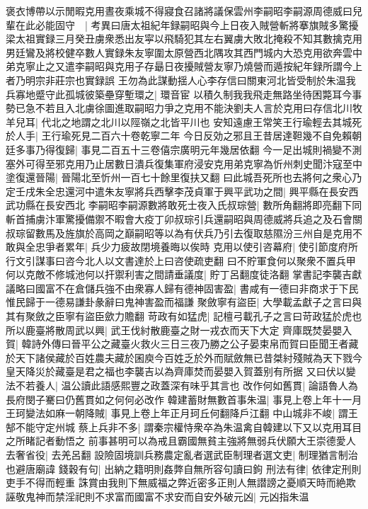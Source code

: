 褒衣博帶以示閒暇克用晝夜乘城不得寢食召諸將議保雲州李嗣昭李嗣源周德威曰兒輩在此必能固守　|{
	考異曰唐太祖紀年録嗣昭與今上日夜入賊營斬將搴旗賊多驚擾梁太祖實録三月癸丑虜衆悉出友寜以飛騎犯其左右翼虜大敗北掩殺不知其數擒克用男廷鸞及將校健卒數人實録朱友寧圍太原營西北隅攻其西門城内大恐克用欲奔雲中弟克寧止之又遣李嗣昭與克用子存朂日夜擾賊營友寧乃燒營而遁按紀年録所謂今上者乃明宗非莊宗也實録誤}
王勿為此謀動揺人心李存信曰關東河北皆受制於朱温我兵寡地蹙守此孤城彼築壘穿塹環之|{
	環音宦}
以積久制我我飛走無路坐待困斃耳今事勢已急不若且入北虜徐圖進取嗣昭力爭之克用不能決劉夫人言於克用曰存信北川牧羊兒耳|{
	代北之地謂之北川以陘嶺之北皆平川也}
安知遠慮王常笑王行瑜輕去其城死於人手|{
	王行瑜死見二百六十卷乾寧二年}
今日反効之邪且王昔居達靼幾不自免賴朝廷多事乃得復歸|{
	事見二百五十三卷僖宗廣明元年幾居依翻}
今一足出城則禍變不測塞外可得至邪克用乃止居數日潰兵復集軍府浸安克用弟克寧為忻州刺史聞汴寇至中塗復還晉陽|{
	晉陽北至忻州一百七十餘里復扶又翻}
曰此城吾死所也去將何之衆心乃定壬戌朱全忠還河中遣朱友寧將兵西擊李茂貞軍于興平武功之間|{
	興平縣在長安西武功縣在長安西北}
李嗣昭李嗣源數將敢死士夜入氏叔琮營|{
	數所角翻將即亮翻下同}
斬首捕虜汴軍驚擾備禦不暇會大疫丁卯叔琮引兵還嗣昭與周德威將兵追之及石會關叔琮留數馬及旌旗於高岡之巔嗣昭等以為有伏兵乃引去復取慈隰汾三州自是克用不敢與全忠爭者累年|{
	兵少力疲故閉境養晦以俟時}
克用以使引咨幕府|{
	使引節度府所行文引謀事曰咨今北人以文書達於上曰咨使疏吏翻}
曰不貯軍食何以聚衆不置兵甲何以克敵不修城池何以扞禦利害之間請垂議度|{
	貯丁呂翻度徒洛翻}
掌書記李襲吉獻議略曰國富不在倉儲兵強不由衆寡人歸有德神固害盈|{
	書咸有一德曰非商求于下民惟民歸于一德易謙卦彖辭曰鬼神害盈而福謙}
聚斂寧有盜臣|{
	大學載孟獻子之言曰與其有聚斂之臣寧有盜臣歛力贍翻}
苛政有如猛虎|{
	記檀弓載孔子之言曰苛政猛於虎也}
所以鹿臺將散周武以興|{
	武王伐紂散鹿臺之財一戎衣而天下大定}
齊庫既焚晏嬰入賀|{
	韓詩外傳曰晉平公之藏臺火救火三日三夜乃勝之公子晏束帛而賀曰臣聞王者藏於天下諸侯藏於百姓農夫藏於囷庾今百姓乏於外而賦斂無已昔桀紂殘賊為天下戮今皇天降災於藏臺是君之福也李襲吉以為齊庫焚而晏嬰入賀蓋别有所据}
又曰伏以變法不若養人|{
	温公讀此語感熙豐之政蓋深有味乎其言也}
改作何如舊貫|{
	論語魯人為長府閔子騫曰仍舊貫如之何何必改作}
韓建蓄財無數首事朱温|{
	事見上卷上年十一月}
王珂變法如麻一朝降賊|{
	事見上卷上年正月珂丘何翻降戶江翻}
中山城非不峻|{
	謂王郜不能守定州城}
蔡上兵非不多|{
	謂秦宗權恃衆卒為朱温禽自韓建以下又以克用耳目之所睹記者動悟之}
前事甚明可以為戒且霸國無貧主強將無弱兵伏願大王崇德愛人去奢省役|{
	去羌呂翻}
設險固境訓兵務農定亂者選武臣制理者選文吏|{
	制理猶言制治也避唐廟諱}
錢穀有句|{
	出納之籍明則姦弊自無所容句讀曰鉤}
刑法有律|{
	依律定刑則吏手不得而輕重}
誅賞由我則下無威福之弊近密多正則人無譛謗之憂順天時而絶欺誣敬鬼神而禁淫祀則不求富而國富不求安而自安外破元凶|{
	元凶指朱温}
